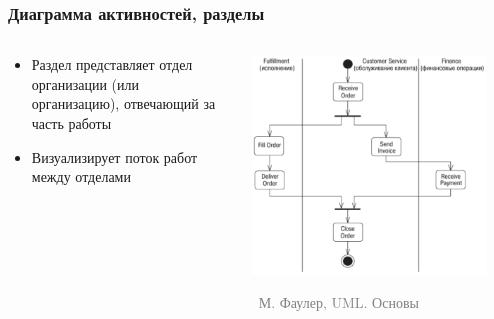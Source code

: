 \documentclass[xetex,mathserif,serif]{beamer}
\newcommand{\attribution}[1] {
    \vspace{-5mm}\begin{flushright}\begin{scriptsize}\textcolor{gray}{\textcopyright\, #1}\end{scriptsize}\end{flushright}
}
\begin{document}
    \begin{frame}
        \frametitle{Диаграмма активностей, разделы}
        \begin{columns}
            \begin{column}{0.5\textwidth}
                \begin{itemize}
                    \item Раздел представляет отдел организации (или организацию), отвечающий за часть работы
                    \item Визуализирует поток работ между отделами
                \end{itemize}
            \end{column}
            \begin{column}{0.5\textwidth}
                \begin{center}
                    \includegraphics[width=0.9\textwidth]{activitySwimlanes.png}
                    \attribution{М. Фаулер, UML. Основы}
                \end{center}
            \end{column}
        \end{columns}
    \end{frame}
\end{document}
